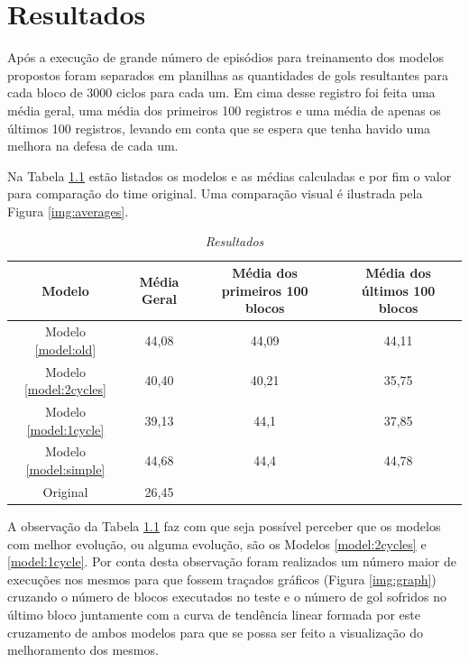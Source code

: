 \chapter{Resultados} \label{sec:results}

Após a execução de grande número de episódios para treinamento dos modelos
propostos foram separados em planilhas as quantidades de gols resultantes para
cada bloco de 3000 ciclos para cada um. Em cima desse registro foi feita uma
média geral, uma média dos primeiros 100 registros e uma média de apenas os
últimos 100 registros, levando em conta que se
espera que tenha havido uma melhora na defesa de cada um.

Na Tabela \ref{tab:results} estão listados os modelos e as médias calculadas e
por fim o valor para comparação do time original. Uma comparação visual é
ilustrada pela Figura \ref{img:averages}.

\begin{table}[hbt]
    \centering
    \begin{tabular}{c|c|c|c}
        Modelo & Média Geral & Média dos primeiros 100 blocos & Média dos últimos 100 blocos \\ \hline
        Modelo \ref{model:old} & 44,08 & 44,09 & 44,11  \\
        Modelo \ref{model:2cycles} & 40,40 & 40,21 & 35,75 \\
        Modelo \ref{model:1cycle} & 39,13 & 44,1 & 37,85 \\
        Modelo \ref{model:simple} & 44,68 & 44,4 & 44,78 \\ \hline
        Original &  26,45\\
    \end{tabular}
    \caption{\textit{Resultados}}
    \label{tab:results}
\end{table}


A observação da Tabela \ref{tab:results} faz com que seja possível perceber que
os modelos com melhor evolução, ou alguma evolução, são os Modelos
\ref{model:2cycles} e \ref{model:1cycle}. Por conta desta observação foram
realizados um número maior de execuções nos mesmos para que fossem 
traçados gráficos (Figura \ref{img:graph}) cruzando o número de blocos executados no teste e o número de
gol sofridos no último bloco juntamente com a curva de tendência linear formada
por este cruzamento de ambos modelos para que se possa ser feito a visualização
do melhoramento dos mesmos.

